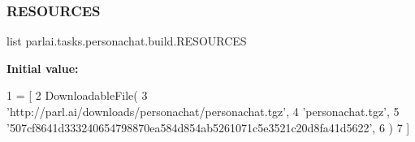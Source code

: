\subsubsection{\texorpdfstring{R\+E\+S\+O\+U\+R\+C\+ES}{RESOURCES}}
{\footnotesize\ttfamily list parlai.\+tasks.\+personachat.\+build.\+R\+E\+S\+O\+U\+R\+C\+ES}

{\bfseries Initial value\+:}
\begin{DoxyCode}
1 =  [
2     DownloadableFile(
3         \textcolor{stringliteral}{'http://parl.ai/downloads/personachat/personachat.tgz'},
4         \textcolor{stringliteral}{'personachat.tgz'},
5         \textcolor{stringliteral}{'507cf8641d333240654798870ea584d854ab5261071c5e3521c20d8fa41d5622'},
6     )
7 ]
\end{DoxyCode}
